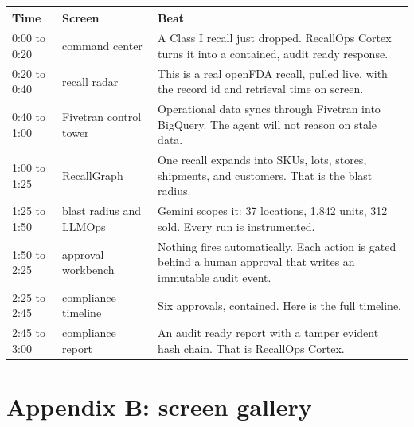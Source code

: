 \documentclass[11pt]{article}
\begin{document}
\begin{center}
\renewcommand{\arraystretch}{1.3}
\begin{tabularx}{\textwidth}{@{}l l X@{}}
\toprule
Time & Screen & Beat \\
\midrule
0:00 to 0:20 & command center & A Class I recall just dropped. RecallOps Cortex turns it into a contained, audit ready response. \\
0:20 to 0:40 & recall radar & This is a real openFDA recall, pulled live, with the record id and retrieval time on screen. \\
0:40 to 1:00 & Fivetran control tower & Operational data syncs through Fivetran into BigQuery. The agent will not reason on stale data. \\
1:00 to 1:25 & RecallGraph & One recall expands into SKUs, lots, stores, shipments, and customers. That is the blast radius. \\
1:25 to 1:50 & blast radius and LLMOps & Gemini scopes it: 37 locations, 1,842 units, 312 sold. Every run is instrumented. \\
1:50 to 2:25 & approval workbench & Nothing fires automatically. Each action is gated behind a human approval that writes an immutable audit event. \\
2:25 to 2:45 & compliance timeline & Six approvals, contained. Here is the full timeline. \\
2:45 to 3:00 & compliance report & An audit ready report with a tamper evident hash chain. That is RecallOps Cortex. \\
\bottomrule
\end{tabularx}
\end{center}

\section{Appendix B: screen gallery}
\end{document}
